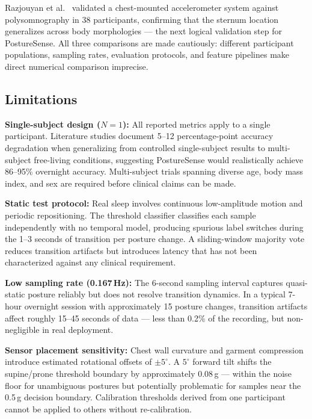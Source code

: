 \documentclass[conference]{IEEEtran}
\begin{document}
Razjouyan et al.\ \cite{razjouyan2017} validated a chest-mounted accelerometer system
against polysomnography in 38 participants, confirming that the sternum location
generalizes across body morphologies --- the next logical validation step for PostureSense.
All three comparisons are made cautiously: different participant populations, sampling
rates, evaluation protocols, and feature pipelines make direct numerical comparison
imprecise.

\subsection{Limitations}

\textbf{Single-subject design ($N=1$):}
All reported metrics apply to a single participant.
Literature studies \cite{alinia2020, razjouyan2017} document 5--12 percentage-point
accuracy degradation when generalizing from controlled single-subject results to
multi-subject free-living conditions, suggesting PostureSense would realistically
achieve 86--95\% overnight accuracy.
Multi-subject trials spanning diverse age, body mass index, and sex are required
before clinical claims can be made.

\textbf{Static test protocol:}
Real sleep involves continuous low-amplitude motion and periodic repositioning.
The threshold classifier classifies each sample independently with no temporal model,
producing spurious label switches during the 1--3 seconds of transition per posture
change.
A sliding-window majority vote reduces transition artifacts but introduces latency
that has not been characterized against any clinical requirement.

\textbf{Low sampling rate (0.167\,Hz):}
The 6-second sampling interval captures quasi-static posture reliably but does not
resolve transition dynamics.
In a typical 7-hour overnight session with approximately 15 posture changes, transition
artifacts affect roughly 15--45 seconds of data --- less than 0.2\% of the recording,
but non-negligible in real deployment.

\textbf{Sensor placement sensitivity:}
Chest wall curvature and garment compression introduce estimated rotational offsets of
$\pm5^\circ$.
A $5^\circ$ forward tilt shifts the supine/prone threshold boundary by approximately
0.08\,g --- within the noise floor for unambiguous postures but potentially
problematic for samples near the 0.5\,g decision boundary.
Calibration thresholds derived from one participant cannot be applied to others without
re-calibration.
\end{document}
